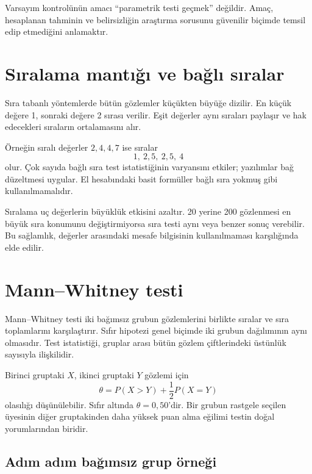 \begin{sezgibox}
Varsayım kontrolünün amacı ``parametrik testi geçmek'' değildir. Amaç,
hesaplanan tahminin ve belirsizliğin araştırma sorusunu güvenilir biçimde
temsil edip etmediğini anlamaktır.
\end{sezgibox}

\section{Sıralama mantığı ve bağlı sıralar}

Sıra tabanlı yöntemlerde bütün gözlemler küçükten büyüğe dizilir. En küçük
değere 1, sonraki değere 2 sırası verilir. Eşit değerler aynı sıraları
paylaşır ve hak edecekleri sıraların ortalamasını alır.

Örneğin sıralı değerler $2,4,4,7$ ise sıralar
\[
1,\ 2{,}5,\ 2{,}5,\ 4
\]
olur. Çok sayıda bağlı sıra test istatistiğinin varyansını etkiler; yazılımlar
bağ düzeltmesi uygular. El hesabındaki basit formüller bağlı sıra yokmuş gibi
kullanılmamalıdır.

Sıralama uç değerlerin büyüklük etkisini azaltır. 20 yerine 200 gözlenmesi en
büyük sıra konumunu değiştirmiyorsa sıra testi aynı veya benzer sonuç verebilir.
Bu sağlamlık, değerler arasındaki mesafe bilgisinin kullanılmaması karşılığında
elde edilir.

\section{Mann--Whitney testi}

Mann--Whitney testi iki bağımsız grubun gözlemlerini birlikte sıralar ve sıra
toplamlarını karşılaştırır. Sıfır hipotezi genel biçimde iki grubun dağılımının
aynı olmasıdır. Test istatistiği, gruplar arası bütün gözlem çiftlerindeki
üstünlük sayısıyla ilişkilidir.

Birinci gruptaki $X$, ikinci gruptaki $Y$ gözlemi için
\[
\theta=P(X>Y)+\frac12P(X=Y)
\]
olasılığı düşünülebilir. Sıfır altında $\theta=0{,}50$'dir. Bir grubun rastgele
seçilen üyesinin diğer gruptakinden daha yüksek puan alma eğilimi testin doğal
yorumlarından biridir.

\subsection{Adım adım bağımsız grup örneği}

